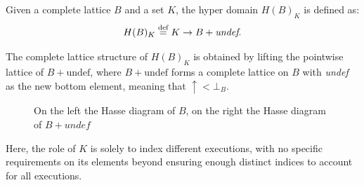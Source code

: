 \documentclass[
  10pt,       %
  twoside,    %
  a4paper,    %
  english,    %
  tikz,       %
  openright,  %
]{book}
\begin{document}
\begin{definition}
  Given a complete lattice $B$ and a set $K$, the hyper domain $H(B)_K$ is
  defined as: $$H(B)_K \stackrel{\text{def}}{=} K \to B + \textit{undef}.$$

  The complete lattice structure of $H(B)_K$ is obtained by lifting the
  pointwise lattice of $B + \text{undef}$, where $B + \text{undef}$ forms a
  complete lattice on $B$ with \textit{undef} as the new bottom element,
  meaning that $\uparrow < \bot_B$.
\end{definition}

\begin{figure}[H]
\begin{center}
\qquad
\qquad
\qquad
{}
\end{center}
\caption{On the left the Hasse diagram of $B$, on the right the Hasse diagram of
$B + undef$}
\end{figure}

Here, the role of $K$ is solely to index different executions, with no specific
requirements on its elements beyond ensuring enough distinct indices to account
for all executions.
\end{document}
